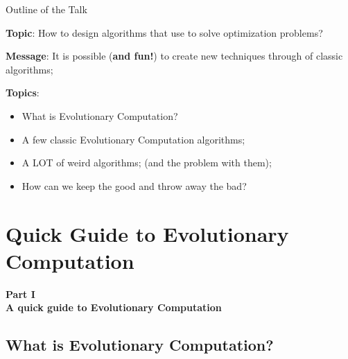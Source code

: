 \documentclass[aspectratio=169]{beamer}
\begin{document}
\begin{frame}{Outline of the Talk}

  {\bf Topic}: How to design algorithms that use  to solve optimization problems?\medskip

  {\bf Message}: It is possible ({\bf and fun!}) to create new techniques through  of classic algorithms;\medskip

  {\bf Topics}:
  \begin{itemize}
    \item What is Evolutionary Computation?
    \item A few classic Evolutionary Computation algorithms;
    \item A LOT of weird algorithms; (and the problem with them);
    \item How can we keep the good and throw away the bad?
  \end{itemize}
\end{frame}

\section{Quick Guide to Evolutionary Computation}

\begin{frame}
  \begin{center}
  {\large{\bf
  Part I\\
  A quick guide to Evolutionary Computation
  }}
  \end{center}
\end{frame}

\subsection{What is Evolutionary Computation?}
\end{document}

